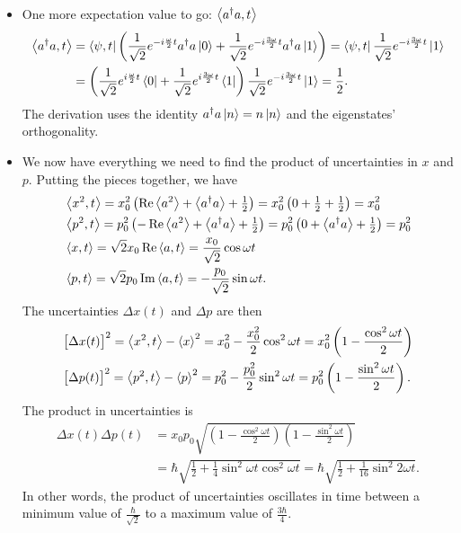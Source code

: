 \documentclass[11pt, a4paper]{article}
\newcommand{\evb}[1]{\big \langle {#1} \big \rangle}  %
\begin{document}
\begin{itemize}
	\item One more expectation value to go: $ \ev{a^{\dagger}a, t} $
	\begin{align*}
		\evb{a^{\dagger}a, t} &=  \bra{\psi, t}\left(\frac{1}{\sqrt{2}}e^{-i\frac{\omega}{2}t}a^{\dagger}a\ket{0} + \frac{1}{\sqrt{2}}e^{-i\frac{3\omega}{2}t}a^{\dagger}a\ket{1} \right) = \bra{\psi, t} \frac{1}{\sqrt{2}}e^{-i\frac{3\omega}{2}t} \ket{1}\\
		&=\left(\frac{1}{\sqrt{2}}e^{i\frac{\omega}{2}t}\bra{0} + \frac{1}{\sqrt{2}}e^{i\frac{3\omega}{2}t}\bra{1}\right)\frac{1}{\sqrt{2}}e^{-i\frac{3\omega}{2}t} \ket{1}  = \frac{1}{2}.
	\end{align*}
	The derivation uses the identity $ a^{\dagger}a \ket{n} = n \ket{n} $ and the eigenstates' orthogonality.
	
	\item We now have everything we need to find the product of uncertainties in $ x $ and $ p $. Putting the pieces together, we have
	\begin{align*}
		&\ev{x^{2}, t} =  x_{0}^{2}\left(\Re\ev{a^{2}} + \evb{a^{\dagger}a} + \tfrac{1}{2}\right) = x_{0}^{2}\left(0 + \tfrac{1}{2} + \tfrac{1}{2}\right) = x_{0}^{2}\\
		&\ev{p^{2}, t} = p_{0}^{2}\left(-\Re \ev{a^{2}} + \evb{a^{\dagger}a} + \tfrac{1}{2}\right) = p_{0}^{2}\left(0 + \ev{a^{\dagger}a} + \tfrac{1}{2} \right) = p_{0}^{2}\\
		&\ev{x, t} = \sqrt{2}x_{0}\Re\ev{a, t} = \frac{x_{0}}{\sqrt{2}}\cos \omega t \\
		&\ev{p, t} = \sqrt{2}p_{0}\Im\ev{a, t} = - \frac{p_{0}}{\sqrt{2}}\sin \omega t.
	\end{align*}
	The uncertainties $ \Delta x(t) $ and $ \Delta p $ are then
	\begin{align*}
		& \big[\Delta x(t)\big]^{2} = \ev{x^{2}, t} - \ev{x}^{2} = x_{0}^{2} - \frac{x_{0}^{2}}{2}\cos^{2} \omega t = x_{0}^{2}\left(1 - \frac{\cos^{2}\omega t}{2}\right)\\
		& \big[\Delta p(t)\big]^{2} = \ev{p^{2}, t} - \ev{p}^{2} = p_{0}^{2} - \frac{p_{0}^{2}}{2}\sin^{2} \omega t = p_{0}^{2}\left(1 - \frac{\sin^{2}\omega t}{2}\right).
	\end{align*}
	The product in uncertainties is
	\begin{align*}
		\Delta x(t) \Delta p(t) &= x_{0}p_{0} \sqrt{\left(1 - \frac{\cos^{2}\omega t}{2}\right)\left(1 - \frac{\sin^{2}\omega t}{2}\right)}\\
		&=\hbar \sqrt{\frac{1}{2} + \frac{1}{4}\sin^{2}\omega t \cos^{2}\omega t  }  = \hbar \sqrt{\frac{1}{2} +  \frac{1}{16}\sin^{2}2\omega t}.
	\end{align*}
	In other words, the product of uncertainties oscillates in time between a minimum value of $ \frac{\hbar}{\sqrt{2}} $ to a maximum value of $ \frac{3\hbar}{4} $. 

\end{itemize}
\end{document}
